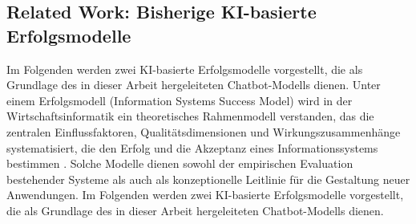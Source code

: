 \subsection{Related Work: Bisherige KI-basierte Erfolgsmodelle} \label{modell}
Im Folgenden werden zwei KI-basierte Erfolgsmodelle vorgestellt, die als Grundlage des in dieser Arbeit hergeleiteten Chatbot-Modells dienen. Unter einem Erfolgsmodell (Information Systems Success Model) wird in der Wirtschaftsinformatik ein theoretisches Rahmenmodell verstanden, das die zentralen Einflussfaktoren, Qualitätsdimensionen und Wirkungszusammenhänge systematisiert, die den Erfolg und die Akzeptanz eines Informationssystems bestimmen \citep{delone2003delone}. Solche Modelle dienen sowohl der empirischen Evaluation bestehender Systeme als auch als konzeptionelle Leitlinie für die Gestaltung neuer Anwendungen. Im Folgenden werden zwei KI-basierte Erfolgsmodelle vorgestellt, die als Grundlage des in dieser Arbeit hergeleiteten Chatbot-Modells dienen.

